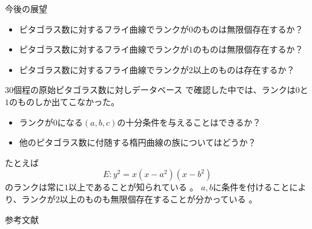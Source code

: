 \documentclass{classes/mybeamer}
\begin{document}
\begin{frame}{今後の展望}
    \begin{itemize}
        \item ピタゴラス数に対するフライ曲線でランクが$0$のものは無限個存在するか？
        \item ピタゴラス数に対するフライ曲線でランクが$1$のものは無限個存在するか？
        \item ピタゴラス数に対するフライ曲線でランクが$2$以上のものは存在するか？
    \end{itemize}
    \begin{alertblock}{}
        30個程の原始ピタゴラス数に対しデータベース \cite{lmfdb}で確認した中では、ランクは$0$と$1$のものしか出てこなかった。
    \end{alertblock}
    \begin{itemize}
        \item ランクが$0$になる$(a,b,c)$の十分条件を与えることはできるか？
        \item 他のピタゴラス数に付随する楕円曲線の族についてはどうか？
    \end{itemize}
    \begin{alertblock}{}
        たとえば
        \begin{equation}
            E: y^2 = x (x - a^2) (x - b^2)
        \end{equation}
        のランクは常に$1$以上であることが知られている \cite{ref:kodaira1963-3}。
        $a,b$に条件を付けることにより、ランクが$2$以上のものも無限個存在することが分かっている \cite{ref:yoshida}。
    \end{alertblock}
\end{frame}

\begin{frame}{参考文献}
    \scriptsize
    \beamertemplatetextbibitems
    
    
\end{frame}
\end{document}
